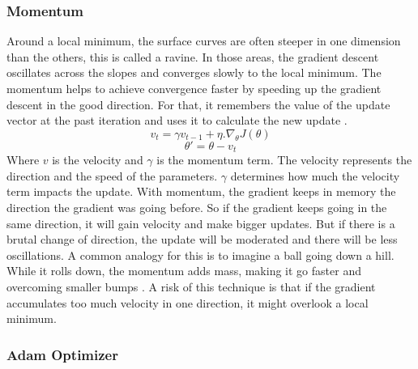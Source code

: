 \subsubsection{Momentum}
Around a local minimum, the surface curves are often steeper in one dimension than the others, this is called a ravine. In those areas, the gradient descent oscillates across the slopes and converges slowly to the local minimum. The momentum helps to achieve convergence faster by speeding up the gradient descent in the good direction. For that, it remembers the value of the update vector at the past iteration and uses it to calculate the new update \cite{optimgrad}. \[ v_t = \gamma v_{t-1} + \eta . \nabla_\theta J(\theta)  \] \[\theta' = \theta - v_t\]
Where \(v\) is the velocity and \(\gamma\) is the momentum term. The velocity represents the direction and the speed of the parameters. \(\gamma\) determines how much the velocity term impacts the update. With momentum, the gradient keeps in memory the direction the gradient was going before. So if the gradient keeps going in the same direction, it will gain velocity and make bigger updates. But if there is a brutal change of direction, the update will be moderated and there will be less oscillations. A common analogy for this is to imagine a ball going down a hill. While it rolls down, the momentum adds mass, making it go faster and overcoming smaller bumps \cite{optimgrad}. A risk of this technique is that if the gradient accumulates too much velocity in one direction, it might overlook a local minimum. 

\subsubsection{Adam Optimizer}

